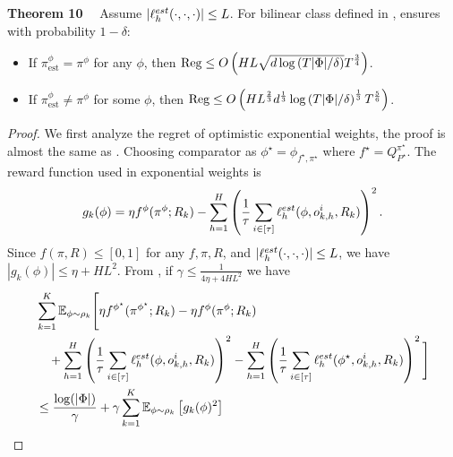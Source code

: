 \noindent \textbf{Theorem 10} \ \ Assume $|\ell^{est}_h(\cdot, \cdot, \cdot)| \le L$.    For bilinear class defined in ,  ensures with probability $1-\delta$: 
\begin{itemize}
    \item If $\pi^\phi_{\text{est}} = \pi^\phi$ for any $\phi$, then $ \text{\rmfamily Reg} \le O\left( HL\sqrt{d \log\left(T|\Phi|/\delta\right)} T^{\frac{3}{4}}\right)$.
    \item If $\pi^\phi_{\text{est}} \neq \pi^\phi$ for some $\phi$, then $\text{\rmfamily Reg} \le O\left(HL^{\frac{2}{3}}d^{\frac{1}{3}}\log\left(T|\Phi|/\delta\right)^{\frac{1}{3}}T^{\frac{5}{6}}\right)$.
\end{itemize}




\begin{proof}
We first analyze the regret of optimistic exponential weights, the proof is almost the same as \cite{foster2024model}. %
Choosing comparator as $\phi^\star = \phi_{f^\star, \pi^\star}$ where $f^\star = Q_{P^\star}^{\pi^\star}$. The reward function used in exponential weights is
\begin{align*}
    g_k(\phi) = \eta f^{\phi}(\pi^{\phi}; R_k) - \sum_{h=1}^H  \left(\frac{1}{\tau} \sum_{i \in [\tau]}\ell^{est}_h(\phi, o_{k,h}^i, R_k)\right)^2.
\end{align*}
 Since $f(\pi, R) \leq [0,1]$ for any $f, \pi, R$, and $|\ell^{est}_h(\cdot, \cdot, \cdot)| \le L$, we have $|g_k(\phi)| \le \eta  + HL^2$.  From , if  $\gamma \le \frac{1}{4\eta  + 4HL^2}$ we have
\begin{align}
    &\sum_{k=1}^K \E_{\phi \sim \rho_k}\Bigg[\eta f^{\phi^\star}(\pi^{\phi^\star}; R_k) - \eta f^{\phi}(\pi^{\phi}; R_k) \nonumber
    \\& \quad + \sum_{h=1}^H \left(\frac{1}{\tau} \sum_{i \in [\tau]}\ellest_h(\phi, o_{k,h}^i, R_k)\right)^2-  \sum_{h=1}^H \left(\frac{1}{\tau} \sum_{i \in [\tau]}\ellest_h(\phi^\star, o_{k,h}^i, R_k)\right)^2\Bigg]  \nonumber
    \\&\le \frac{\log(|\Phi|)}{\gamma} + \gamma \sum_{k=1}^K \E_{\phi \sim \rho_k}\left[g_k(\phi)^2\right] \nonumber

\end{align}
\end{proof}
